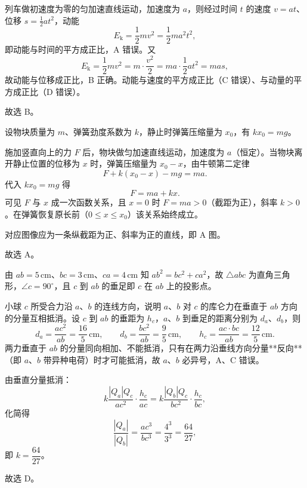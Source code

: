 

\begin{answer}
列车做初速度为零的匀加速直线运动，加速度为 $a$，则经过时间 $t$ 的速度 $v=at$、位移 $s=\frac{1}{2}at^{2}$，动能
\[
  E_{\mathrm{k}}=\frac{1}{2}mv^{2}=\frac{1}{2}ma^{2}t^{2},
\]
即动能与时间的平方成正比，A 错误。又
\[
  E_{\mathrm{k}}=\frac{1}{2}mv^{2}=m\cdot\frac{v^{2}}{2}=ma\cdot\frac{1}{2}at^{2}=mas,
\]
故动能与位移成正比，B 正确。动能与速度的平方成正比（C 错误）、与动量的平方成正比（D 错误）。

故选 B。
\end{answer}

\begin{answer}
设物块质量为 $m$、弹簧劲度系数为 $k$，静止时弹簧压缩量为 $x_{0}$，有 $kx_{0}=mg$。

施加竖直向上的力 $F$ 后，物块做匀加速直线运动，加速度为 $a$（恒定）。当物块离开静止位置的位移为 $x$ 时，弹簧压缩量为 $x_{0}-x$，由牛顿第二定律
\[
  F+k(x_{0}-x)-mg=ma .
\]
代入 $kx_{0}=mg$ 得
\[
  F=ma+kx .
\]
可见 $F$ 与 $x$ 成一次函数关系，且 $x=0$ 时 $F=ma>0$（截距为正），斜率 $k>0$。在弹簧恢复原长前（$0\le x\le x_{0}$）该关系始终成立。

对应图像应为一条纵截距为正、斜率为正的直线，即 A 图。

故选 A。
\end{answer}

\begin{answer}
由 $ab=5\,\si{\centi\metre}$、$bc=3\,\si{\centi\metre}$、$ca=4\,\si{\centi\metre}$ 知 $ab^{2}=bc^{2}+ca^{2}$，故 $\triangle abc$ 为直角三角形，$\angle c=90^{\circ}$，且 $c$ 到 $ab$ 的垂足即 $c$ 在 $ab$ 上的投影点。

小球 $c$ 所受合力沿 $a$、$b$ 的连线方向，说明 $a$、$b$ 对 $c$ 的库仑力在垂直于 $ab$ 方向的分量互相抵消。设 $c$ 到 $ab$ 的垂距为 $h_{c}$，$a$、$b$ 到垂足的距离分别为 $d_{a}$、$d_{b}$，则
\[
  d_{a}=\frac{ac^{2}}{ab}=\frac{16}{5}\,\si{\centi\metre},\qquad
  d_{b}=\frac{bc^{2}}{ab}=\frac{9}{5}\,\si{\centi\metre},\qquad
  h_{c}=\frac{ac\cdot bc}{ab}=\frac{12}{5}\,\si{\centi\metre}.
\]
两力垂直于 $ab$ 的分量同向相加、不能抵消，只有在两力沿垂线方向分量**反向**（即 $a$、$b$ 带异种电荷）时才可能抵消，故 $a$、$b$ 必异号，A、C 错误。

由垂直分量抵消：
\[
  k\frac{|Q_{a}|Q_{c}}{ac^{2}}\cdot\frac{h_{c}}{ac}
  =k\frac{|Q_{b}|Q_{c}}{bc^{2}}\cdot\frac{h_{c}}{bc},
\]
化简得
\[
  \frac{|Q_{a}|}{|Q_{b}|}=\frac{ac^{3}}{bc^{3}}=\frac{4^{3}}{3^{3}}=\frac{64}{27},
\]
即 $k=\dfrac{64}{27}$。

故选 D。
\end{answer}

